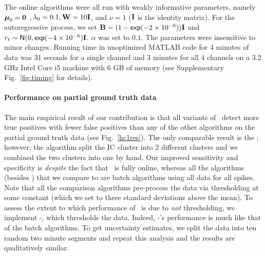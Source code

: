 

The online algorithms were all run with weakly informative parameters, namely  $\boldsymbol{\mu}_0=\boldsymbol{0}$ $,\lambda_0=0.1,\mathbf{W}=10\mathbf{I}$, and $\nu=1$ ($\mathbf{I}$ is the identity matrix).  
For the autoregressive process, we set $\mathbf{B}=(1-\mathsf{exp}(-2\times 10^{-6}))\mathbf{I}$ and $r_t\sim\mathsf{N}(0,\mathsf{exp}(-4\times 10^{-6})\mathbf{I}$.  $\alpha$ was set to $0.1$. The parameters were insensitive to minor changes.  Running time in unoptimized MATLAB code for 4 minutes of data was 31 seconds for a single channel and 3 minutes for all 4 channels on a 3.2 GHz Intel Core i5 machine with 6 GB of memory (see Supplementary Fig.\ \ref{fig:timing} for details).

\vspace{-.1in}
\paragraph{Performance on partial ground truth data}



The main empirical result of our contribution is that all variants of \smug\ detect more true positives with fewer false positives than any of the other algorithms on the partial ground truth data (see Fig.\ \ref{hc1res}).  The only comparable result is the ; however, the  algorithm split the IC cluster into 2 different clusters and we combined the two clusters into one by hand.  Our improved sensitivity and specificity is \emph{despite} 
the fact that \smug\ is fully online, whereas all the algorithms (besides ) that we compare to are batch algorithms using all data for all spikes.   Note that all the comparison algorithms pre-process the data via thresholding at some constant (which we set to three standard deviations above the mean).  To assess the extent to which performance of \smug\ is due to \emph{not} thresholding, we implement -\smug, which thresholds the data.  Indeed, -\smug's performance is much like that of the batch algorithms.  To get uncertainty estimates, we split the data into ten random two minute segments and repeat this analysis and the results are qualitatively similar. %


